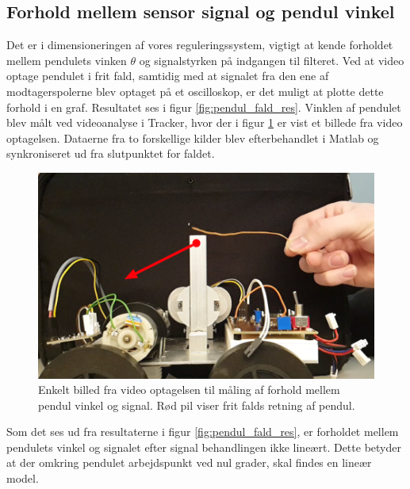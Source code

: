 \subsection{Forhold mellem sensor signal og pendul vinkel}
Det er i dimensioneringen af vores reguleringssystem, vigtigt at kende forholdet mellem pendulets vinken $\theta$ og signalstyrken på indgangen til filteret.
Ved at video optage pendulet i frit fald, samtidig med at signalet fra den ene af modtagerspolerne blev optaget på et oscilloskop, er det muligt at plotte dette forhold i en graf. Resultatet ses i figur \ref{fig:pendul_fald_res}.
Vinklen af pendulet blev målt ved videoanalyse i Tracker, hvor der i figur \ref{fig:pendul_fald_vid} er vist et billede fra video optagelsen.
Dataerne fra to forskellige kilder blev efterbehandlet i Matlab og synkroniseret ud fra slutpunktet for faldet.
\begin{figure}[h!]
	\centering
	\includegraphics[width=.6\textwidth]{billeder/pendul_fald_vid.png}
	\caption{Enkelt billed fra video optagelsen til måling af forhold mellem pendul vinkel og signal. Rød pil viser frit falds retning af pendul.}
	\label{fig:pendul_fald_vid}
\end{figure}
\FloatBlock
Som det ses ud fra resultaterne i figur \ref{fig:pendul_fald_res}, er forholdet mellem pendulets vinkel og signalet efter signal behandlingen ikke lineært.
Dette betyder at der omkring pendulet arbejdspunkt ved nul grader, skal findes en lineær model.  

